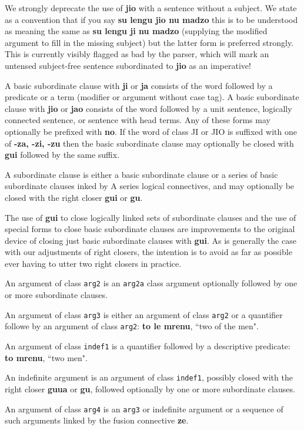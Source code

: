 \documentclass[12pt]{book}
\begin{document}
We strongly deprecate the use of {\bf jio} with a sentence without a subject.  We state as a convention that
if you say {\bf su lengu jio nu madzo} this is to be understood as meaning the same as {\bf su lengu ji nu madzo} (supplying the modified argument to fill in the missing subject) but the latter form is preferred strongly.  This is currently visibly flagged as bad by the parser, which will mark an untensed subject-free sentence subordinated to {\bf jio} as an imperative!

A basic subordinate clause with {\bf ji} or {\bf ja} consists of the word followed by a predicate or a term (modifier or argument without case tag).   A basic subordinate clause with {\bf jio} or {\bf jao} consists of the word followed by a unit sentence, logically connected sentence, or sentence with head terms.  Any of these forms may optionally be prefixed with {\bf no}.  If the word of class JI or JIO is suffixed with one of {\bf -za, -zi, -zu}
then the basic subordinate clause may optionally be closed with {\bf gui} followed by the same suffix.

A subordinate clause is either a basic subordinate clause or a series of basic subordinate clauses inked by A series logical connectives, and may optionally be closed with the right closer {\bf gui} or {\bf gu}.  

The use of {\bf gui} to close logically linked sets of subordinate clauses and the use of special forms to close basic subordinate clauses are improvements to the original device of closing just basic subordinate clauses with {\bf gui}.  As is generally the case with our adjustments of right closers, the intention is to avoid as far as possible ever having to utter two right closers in practice.

An argument of class {\tt arg2} is an {\tt arg2a} class argument optionally followed by one or more subordinate clauses.

An argument of class {\tt arg3} is either an argument of class {\tt arg2} or a quantifier followe by an argument of class {\tt arg2}:
{\bf to le mrenu}, ``two of the men".

An argument of class {\tt indef1} is a quantifier followed by a descriptive predicate:  {\bf to mrenu}, ``two men".

An indefinite argument is an argument of class {\tt indef1}, possibly closed with the right closer {\bf guua} or {\bf gu}, followed optionally by one or more subordinate clauses.

An argument of class {\tt arg4} is an {\tt arg3} or indefinite argument or a sequence of such arguments linked by the fusion connective {\bf ze}.
\end{document}

